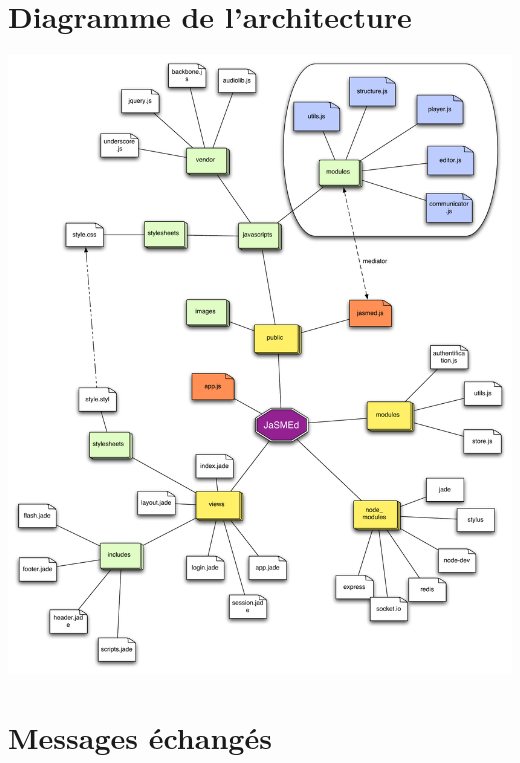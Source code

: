 \documentclass[pdftex,12pt,a4paper]{article}
\begin{document}
\section*{Diagramme de l'architecture}
\includegraphics[width=\linewidth]{./jasmedDirectory}

\section*{Messages échangés}
\end{document}
